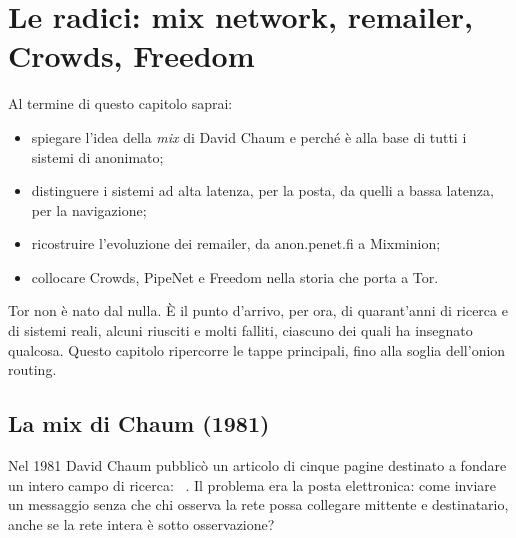 \chapter{Le radici: mix network, remailer, Crowds, Freedom}\label{cap:02-radici}

\begin{obiettivi}
Al termine di questo capitolo saprai:
\begin{itemize}[nosep]
  \item spiegare l'idea della \emph{mix} di David Chaum e perché è alla base di tutti i sistemi di anonimato;
  \item distinguere i sistemi ad alta latenza, per la posta, da quelli a bassa latenza, per la navigazione;
  \item ricostruire l'evoluzione dei remailer, da anon.penet.fi a Mixminion;
  \item collocare Crowds, PipeNet e Freedom nella storia che porta a Tor.
\end{itemize}
\end{obiettivi}

Tor non è nato dal nulla. È il punto d'arrivo, per ora, di quarant'anni di ricerca e di sistemi reali, alcuni riusciti e molti falliti, ciascuno dei quali ha insegnato qualcosa. Questo capitolo ripercorre le tappe principali, fino alla soglia dell'onion routing.

\section{La mix di Chaum (1981)}\label{sec:radici-chaum}

Nel 1981 David Chaum pubblicò un articolo di cinque pagine destinato a fondare un intero campo di ricerca: ~\cite{chaum1981untraceable}. Il problema era la posta elettronica: come inviare un messaggio senza che chi osserva la rete possa collegare mittente e destinatario, anche se la rete intera è sotto osservazione?

